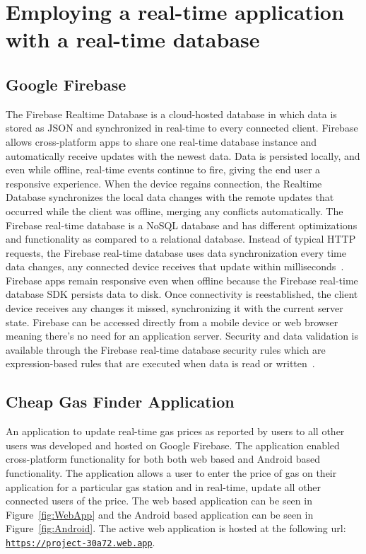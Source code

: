 \documentclass[conference]{IEEEtran}
\begin{document}
\section{Employing a real-time application with a real-time database}
\subsection{Google Firebase}
The Firebase Realtime Database is a cloud-hosted database in which data is stored as JSON and synchronized in real-time to every connected client. Firebase allows cross-platform apps to share one real-time database instance and automatically receive updates with the newest data. Data is persisted locally, and even while offline, real-time events continue to fire, giving the end user a responsive experience. When the device regains connection, the Realtime Database synchronizes the local data changes with the remote updates that occurred while the client was offline, merging any conflicts automatically\cite{Firebase}.
\indent The Firebase real-time database is a NoSQL database and has different optimizations and functionality as compared to a relational database.  Instead of typical HTTP requests, the Firebase real-time database uses data synchronization every time data changes, any connected device receives that update within milliseconds~\cite{Firebase}. Firebase apps remain responsive even when offline because the Firebase real-time database SDK persists data to disk. Once connectivity is reestablished, the client device receives any changes it missed, synchronizing it with the current server state\cite{Firebase}.
Firebase can be accessed directly from a mobile device or web browser meaning there’s no need for an application server. Security and data validation is available through the Firebase real-time database security rules which are expression-based rules that are executed when data is read or written~\cite{Firebase}.

\subsection{Cheap Gas Finder Application}
An application to update real-time gas prices as reported by users to all other users was developed and hosted on Google Firebase. The application enabled cross-platform functionality for both both web based and Android based functionality. The application allows a user to enter the price of gas on their application for a particular gas station and in real-time, update all other connected users of the price. The web based application can be seen in Figure~\ref{fig:WebApp} and the Android based application can be seen in Figure~\ref{fig:Android}. The active web application is hosted at the following url: \color{blue}\underline{\texttt{https://project-30a72.web.app}}.\color{black}
\end{document}
